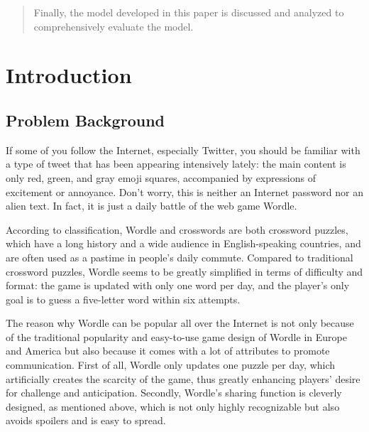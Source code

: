 \documentclass[12pt]{article}  %
\begin{document}
\begin{abstract}
Finally, the model developed in this paper is discussed and analyzed to comprehensively evaluate the model.


\end{abstract}

\maketitle  %
\tableofcontents  %


\section{Introduction}
\subsection{Problem Background}
If some of you follow the Internet, especially Twitter, you should be familiar with a type of tweet that has been appearing intensively lately: the main content is only red, green, and gray emoji squares, accompanied by expressions of excitement or annoyance. Don't worry, this is neither an Internet password nor an alien text. In fact, it is just a daily battle of the web game Wordle.
  
According to classification, Wordle and crosswords are both crossword puzzles, which have a long history and a wide audience in English-speaking countries, and are often used as a pastime in people's daily commute. Compared to traditional crossword puzzles, Wordle seems to be greatly simplified in terms of difficulty and format: the game is updated with only one word per day, and the player's only goal is to guess a five-letter word within six attempts.

The reason why Wordle can be popular all over the Internet is not only because of the traditional popularity and easy-to-use game design of Wordle in Europe and America but also because it comes with a lot of attributes to promote communication. First of all, Wordle only updates one puzzle per day, which artificially creates the scarcity of the game, thus greatly enhancing players' desire for challenge and anticipation. Secondly, Wordle's sharing function is cleverly designed, as mentioned above, which is not only highly recognizable but also avoids spoilers and is easy to spread.
\end{document}
